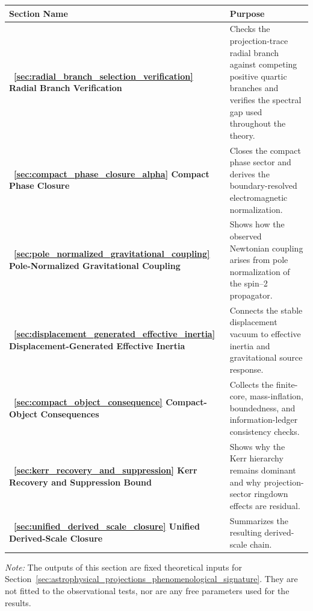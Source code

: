 \documentclass[11pt]{article}
\renewcommand{\arraystretch}{1.22}
\renewcommand{\arraystretch}{1.4}
\begin{document}
\begin{table}[htbp]
\small
    \centering
    \renewcommand{\arraystretch}{1.2}
    \begin{tabular}{@{} p{} p{} @{}}
        \toprule
        \textbf{Section Name} & \textbf{Purpose} \\
        \midrule
        \textbf{~\ref{sec:radial_branch_selection_verification}   Radial Branch Verification} & Checks the projection-trace radial branch against competing positive quartic branches and verifies the spectral gap used throughout the theory. \\
        
        \textbf{~\ref{sec:compact_phase_closure_alpha}     Compact Phase Closure} & Closes the compact phase sector and derives the boundary-resolved electromagnetic normalization. \\
        
        \textbf{~\ref{sec:pole_normalized_gravitational_coupling}     Pole-Normalized Gravitational Coupling} & Shows how the observed Newtonian coupling arises from pole normalization of the spin--2 propagator. \\
        
        \textbf{~\ref{sec:displacement_generated_effective_inertia}     Displacement-Generated Effective Inertia} & Connects the stable displacement vacuum to effective inertia and gravitational source response. \\
        
        \textbf{~\ref{sec:compact_object_consequence}    Compact-Object Consequences} & Collects the finite-core, mass-inflation, boundedness, and information-ledger consistency checks. \\
        
        \textbf{~\ref{sec:kerr_recovery_and_suppression}    Kerr Recovery and Suppression Bound} & Shows why the Kerr hierarchy remains dominant and why projection-sector ringdown effects are residual. \\
        
        \textbf{~\ref{sec:unified_derived_scale_closure}    Unified Derived-Scale Closure} & Summarizes the resulting derived-scale chain. \\
        \bottomrule
    \end{tabular}
    \label{tab:closure_sequence_names}
\end{table}

\noindent\textit{Note:} The outputs of this section are fixed theoretical inputs for Section~\ref{sec:astrophysical_projections_phenomenological_signature}. They are not fitted to the observational tests, nor are any free parameters used for the results.
\end{document}
